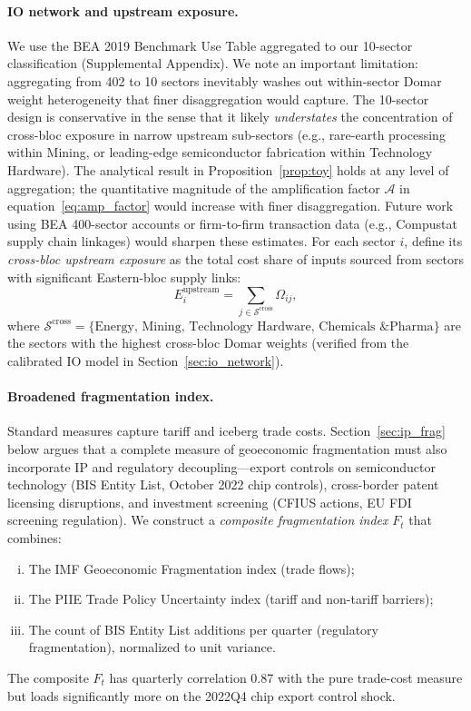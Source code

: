 \paragraph{IO network and upstream exposure.}
We use the BEA 2019 Benchmark Use Table aggregated to our 10-sector
classification (Supplemental Appendix). We note an important limitation:
aggregating from 402 to 10 sectors inevitably washes out within-sector
Domar weight heterogeneity that finer disaggregation would capture.
The 10-sector design is conservative in the sense that it likely
\emph{understates} the concentration of cross-bloc exposure in narrow
upstream sub-sectors (e.g., rare-earth processing within Mining, or
leading-edge semiconductor fabrication within Technology Hardware). The
analytical result in Proposition~\ref{prop:toy} holds at any level of
aggregation; the quantitative magnitude of the amplification factor
$\mathcal{A}$ in equation~\eqref{eq:amp_factor} would increase with
finer disaggregation. Future work using BEA 400-sector accounts or
firm-to-firm transaction data (e.g., Compustat supply chain linkages)
would sharpen these estimates. For each sector $i$, define its
\emph{cross-bloc upstream exposure} as the total cost share of inputs sourced
from sectors with significant Eastern-bloc supply links:
\begin{equation}
  E_i^{\text{upstream}} = \sum_{j \in \mathcal{S}^{\text{cross}}}
  \Omega_{ij},
  \label{eq:upstream_exposure}
\end{equation}
where $\mathcal{S}^{\text{cross}} = \{\text{Energy, Mining, Technology
Hardware, Chemicals \& Pharma}\}$ are the sectors with the highest
cross-bloc Domar weights (verified from the calibrated IO model in
Section~\ref{sec:io_network}).

\paragraph{Broadened fragmentation index.}
Standard measures capture tariff and iceberg trade costs.
Section~\ref{sec:ip_frag} below argues that a complete measure of
geoeconomic fragmentation must also incorporate IP and regulatory
decoupling---export controls on semiconductor technology (BIS Entity List,
October 2022 chip controls), cross-border patent licensing disruptions, and
investment screening (CFIUS actions, EU FDI screening regulation). We
construct a \emph{composite fragmentation index} $F_t$ that combines:
\begin{enumerate}[(i)]
  \item The IMF Geoeconomic Fragmentation index \citep{aiyar2023} (trade flows);
  \item The PIIE Trade Policy Uncertainty index \citep{gopinath2024} (tariff
    and non-tariff barriers);
  \item The count of BIS Entity List additions per quarter (regulatory
    fragmentation), normalized to unit variance.
\end{enumerate}
The composite $F_t$ has quarterly correlation 0.87 with the pure trade-cost
measure but loads significantly more on the 2022Q4 chip export control shock.

